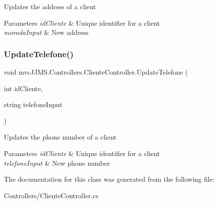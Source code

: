 Updates the address of a client 


\begin{DoxyParams}{Parameters}
{\em id\+Cliente} & Unique identifier for a client\\
\hline
{\em morada\+Input} & New address\\
\hline
\end{DoxyParams}
\mbox{\label{classmvc_j_j_m_s_1_1_controllers_1_1_cliente_controller_aefbf9f1512ccb78afa9acaef47b95b98}} 
\subsubsection{\texorpdfstring{Update\+Telefone()}{UpdateTelefone()}}
{\footnotesize\ttfamily void mvc\+J\+J\+M\+S.\+Controllers.\+Cliente\+Controller.\+Update\+Telefone (\begin{DoxyParamCaption}\item[{int}]{id\+Cliente,  }\item[{string}]{telefone\+Input }\end{DoxyParamCaption})\hspace{0.3cm}{\ttfamily [inline]}}



Updates the phone number of a client 


\begin{DoxyParams}{Parameters}
{\em id\+Cliente} & Unique identifier for a client\\
\hline
{\em telefone\+Input} & New phone number\\
\hline
\end{DoxyParams}


The documentation for this class was generated from the following file\+:\begin{DoxyCompactItemize}
\item 
Controllers/Cliente\+Controller.\+cs\end{DoxyCompactItemize}

